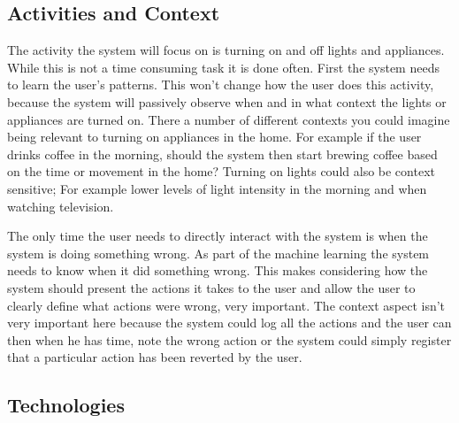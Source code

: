 \subsection{Activities and Context}
The activity the system will focus on is turning on and off lights and
appliances. While this is not a time consuming task it is done often. First the
system needs to learn the user's patterns. This won't change how the user does
this activity, because the system will passively observe when and in what
context the lights or appliances are turned on. There a number of different
contexts you could imagine being relevant to turning on appliances in the home.
For example if the user drinks coffee in the morning, should the system then
start brewing coffee based on the time or movement in the home? Turning on
lights could also be context sensitive; For example lower levels of light
intensity in the morning and when watching television.

The only time the user needs to directly interact with the system is when the
system is doing something wrong. As part of the machine learning the system
needs to know when it did something wrong. This makes considering how the system
should present the actions it takes to the user and allow the user to clearly
define what actions were wrong, very important. The context aspect isn't very
important here because the system could log all the actions and the user can
then when he has time, note the wrong action or the system could simply register
that a particular action has been reverted by the user.

\subsection{Technologies}
\label{sub:Technologies}
